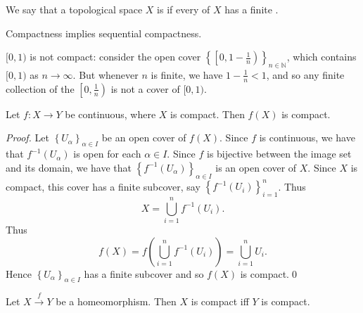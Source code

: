 \documentclass[notoc,notitlepage]{tufte-book}
\begin{document}
\begin{defn}[Compactness]\label{defn:compactness}
  We say that a topological space $X$ is  if every 
  of $X$ has a finite .
\end{defn}

\begin{lemma}\label{lemma:compactness_implies_sequential_compactness}
  Compactness implies sequential compactness.
\end{lemma}

\begin{eg}
  $[ 0, 1 )$ is not compact: consider the open cover
  $\left\{ \left[ 0, 1 - \frac{1}{n} \right) \right\}_{n \in \mathbb{N}}$, which contains
  $[0, 1)$ as $n \to \infty$. But whenever $n$ is finite, we have $1 - \frac{1}{n} < 1$,
  and so any finite collection of the $\left[0, \frac{1}{n}\right)$ is not a cover of
  $[0, 1)$.
\end{eg}

\begin{thm}\label{thm:continuous_maps_map_compact_sets_to_compact_images}
  Let $f : X \to Y$ be continuous, where $X$ is compact. Then $f(X)$ is compact.
\end{thm}

\begin{proof}
  Let $\left\{ U_\alpha \right\}_{\alpha \in I}$ be an open cover of $f(X)$. Since
  $f$ is continuous, we have that $f^{-1} \left( U_\alpha \right)$ is open for each
  $\alpha \in I$. Since $f$ is bijective between the image set and its domain, we
  have that $\left\{ f^{-1} \left( U_\alpha \right) \right\}_{\alpha \in I}$ is an
  open cover of $X$. Since $X$ is compact, this cover has a finite subcover, say
  $\left\{ f^{-1} \left( U_i \right) \right\}_{i = 1}^{n}$. Thus
  \begin{equation*}
    X = \bigcup_{i=1}^{n} f^{-1} \left( U_i \right).
  \end{equation*}
  Thus
  \begin{equation*}
    f(X) = f \left( \bigcup_{i=1}^{n} f^{-1} \left( U_i \right) \right) = \bigcup_{i=1}^{n} U_i.
  \end{equation*}
  Hence $\left\{ U_\alpha \right\}_{\alpha \in I}$ has a finite subcover and so
  $f(X)$ is compact.\qed\
\end{proof}

\begin{crly}\label{crly:homeomorphic_maps_map_compact_sets_to_compact_sets}
  Let $X \overset{f}{\to} Y$ be a homeomorphism. Then $X$ is compact iff
  $Y$ is compact.
\end{crly}
\end{document}
